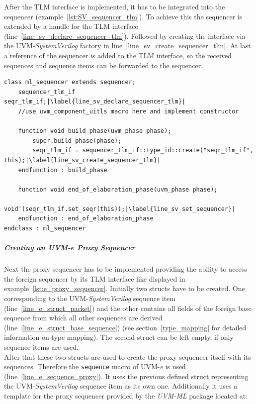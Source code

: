 After the TLM interface is implemented, it has to be integrated into the sequencer (example~\ref{lst:SV_sequencer_tlm}). To achieve this the sequencer is extended by a handle for the TLM interface (line~\ref{line_sv_declare_sequencer_tlm}). Followed by creating the interface via the UVM-\emph{SystemVerilog} factory in line~\ref{line_sv_create_sequencer_tlm}. At last a reference of the sequencer is added to the TLM interface, so the received sequences and sequence items can be forwarded to the sequencer. 
\lstset{language=SystemVerilog, numbers = left, escapechar=|, breaklines=true}
\begin{lstlisting}[frame=htrbl, caption={SystemVerilog: extending the sequencer by a TLM interface},
label={lst:SV_sequencer_tlm}]
class ml_sequencer extends sequencer;
    sequencer_tlm_if seqr_tlm_if;|\label{line_sv_declare_sequencer_tlm}|
    //use uvm_component_uitls macro here and implement constructor

    function void build_phase(uvm_phase phase);
        super.build_phase(phase);
        seqr_tlm_if = sequencer_tlm_if::type_id::create("seqr_tlm_if", this);|\label{line_sv_create_sequencer_tlm}|
    endfunction : build_phase

    function void end_of_elaboration_phase(uvm_phase phase);
        void'(seqr_tlm_if.set_seqr(this));|\label{line_sv_set_sequencer}|
    endfunction : end_of_elaboration_phase
endclass : ml_sequencer
\end{lstlisting}
\subparagraph{Creating an UVM-\textit{e} Proxy Sequencer} 
Next the proxy sequencer has to be implemented providing the ability to access the foreign sequencer by its TLM interface like displayed in example~\ref{lst:e_proxy_sequencer}. Initially two structs have to be created. One corresponding to the UVM-\emph{SystemVerilog} sequence item (line~\ref{line_e_struct_packet}) and the other contains all fields of the foreign base sequence from which all other sequences are derived (line~\ref{line_e_struct_base_sequence}) (see section~\ref{type_mapping} for detailed information on type mapping). The second struct can be left empty, if only sequence items are used.\\
After that these two structs are used to create the proxy sequencer itself with its sequences. Therefore the \lstinline$sequence$ macro of UVM-\textit{e} is used (line~\ref{line_e_sequence_proxy}). It uses the previous defined struct representing the UVM-\emph{SystemVerilog} sequence item as its own one. Additionally it uses a template for the proxy sequencer provided by the \emph{UVM-ML} package located at:
